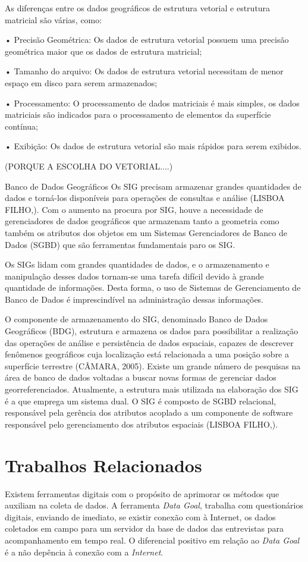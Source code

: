 \documentclass[
	12pt,				%
    oneside,			%
	a4paper,			%
	english,			%
	french,				%
	spanish,			%
	brazil,				%
	]{abntex2}
\begin{document}
As diferenças entre os dados geográficos de estrutura vetorial e estrutura matricial são várias, como:

•	Precisão Geométrica: Os dados de estrutura vetorial possuem uma precisão geométrica maior que os dados de estrutura matricial;

•	Tamanho do arquivo: Os dados de estrutura vetorial necessitam de menor espaço em disco para serem armazenados;

•	Processamento: O processamento de dados matriciais é mais simples, os dados matriciais são indicados para o processamento de elementos da superfície contínua;

•	Exibição: Os dados de estrutura vetorial são mais rápidos para serem exibidos.

(PORQUE A ESCOLHA DO VETORIAL....)

Banco de Dados Geográficos
Os SIG precisam armazenar grandes quantidades de dados e torná-los disponíveis para operações de consultas e análise (LISBOA FILHO,). Com o aumento na procura por SIG, houve a necessidade de gerenciadores de dados geográficos que armazenam tanto a geometria como também os atributos dos objetos em um Sistemas Gerenciadores de Banco de Dados (SGBD) que são ferramentas fundamentais paro os SIG.

Os SIGs lidam com grandes quantidades de dados, e o armazenamento e manipulação desses dados tornam-se uma tarefa difícil devido à grande quantidade de informações. Desta forma, o uso de Sistemas de Gerenciamento de Banco de Dados é imprescindível na administração dessas informações.

O componente de armazenamento do SIG, denominado Banco de Dados Geográficos (BDG), estrutura e armazena os dados para possibilitar a realização das operações de análise e persistência de dados espaciais, capazes de descrever fenômenos geográficos cuja localização está relacionada a uma posição sobre a superfície terrestre (CÂMARA, 2005).
Existe um grande número de pesquisas na área de banco de dados voltadas a buscar novas formas de gerenciar dados georreferenciados. Atualmente, a estrutura mais utilizada na elaboração dos SIG é a que emprega um sistema dual. O SIG é composto de SGBD relacional, responsável pela gerência dos atributos acoplado a um componente de software responsável pelo gerenciamento dos atributos espaciais (LISBOA FILHO,).




\chapter{Trabalhos Relacionados}
Existem ferramentas digitais com o propósito de aprimorar os métodos que auxiliam na coleta de dados. A ferramenta \textit{Data Goal}, trabalha com questionários digitais, enviando de imediato, se existir conexão com à Internet, os dados coletados em campo para um servidor da base de dados das entrevistas para acompanhamento em tempo real. O diferencial positivo em relação ao \textit{Data Goal} é a não depência à conexão com a \textit{Internet}.
\end{document}
